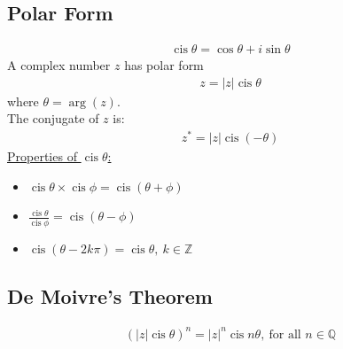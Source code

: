 \documentclass[10pt, a4paper, titlepage]{article}
\DeclareMathOperator\cis{cis}
\begin{document}
\begin{multicols*}{3}
	\subsection{Polar Form}
	\begin{align}
		\cis{\theta}=\cos{\theta}+i\sin{\theta}
	\end{align}
	A complex number $z$ has polar form
	\begin{align}
		z=|z|\cis{\theta}
	\end{align}
	where $\theta = \arg({z})$.\\
	The conjugate of $z$ is:
	\begin{align}
		z^*=|z|\cis{(-\theta)}
	\end{align}
	\underline{Properties of $\cis{\theta}$:}
	\begin{itemize}
		\item $\cis{\theta}\times \cis{\phi}=\cis{(\theta +\phi )}$
		\item $\frac{\cis{\theta}}{\cis{\phi}}=\cis{(\theta -\phi )}$
		\item $\cis{(\theta -2k\pi )}=\cis{\theta},\ k\in \mathbb{Z}$
	\end{itemize}


	\dotfill
	\subsection{De Moivre's Theorem}
	\begin{align}
		(|z|\cis{\theta})^n=|z|^n\cis{n\theta},\ \text{for all }n\in \mathbb{Q}
	\end{align}
	\dotfill

\end{multicols*}
\end{document}
